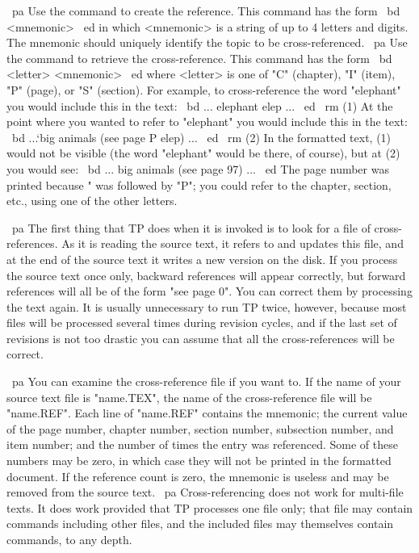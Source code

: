 ~pa Use the command \MR to create the reference.
This command has the form
~bd \MR <mnemonic> ~ed
in which <mnemonic> is a string of up to 4 letters and digits.
The mnemonic should uniquely identify the topic to be cross-referenced.
~pa Use the command \RR to retrieve the cross-reference.
This command has the form
~bd \RR <letter> <mnemonic> ~ed
where <letter> is one of "C" (chapter), "I" (item), "P" (page), 
or "S" (section).
For example, to cross-reference the word "elephant" you would include this
in the text:
~bd ... elephant \MR elep ... ~ed ~rm (1)
At the point where you wanted to refer to "elephant" you would include
this in the text:
~bd ...`big animals (see page \RR P elep) ... ~ed ~rm (2)
In the formatted text, (1) would not be visible (the word "elephant" would
be there, of course), but at (2) you would see:
~bd ... big animals (see page 97) ... ~ed
The page number was printed because \RR" was followed by "P"; you could
refer to the chapter, section, etc., using one of the other letters.

~pa The first thing that TP does when it is invoked is to look for a file
of cross-references.
As it is reading the source text, it refers to and updates this file, and
at the end of the source text it writes a new version on the disk.
If you process the source text once only, backward references will appear
correctly, but forward references will all be of the form "see page 0".
You can correct them by processing the text again.
It is usually unnecessary to run TP twice, however, because most files
will be processed several times during revision cycles, and if the last
set of revisions is not too drastic you can assume that all the
cross-references will be correct.

~pa You can examine the cross-reference file if you want to.
If the name of your source text file is "name.TEX", the name of the
cross-reference file will be "name.REF".
Each line of "name.REF" contains the mnemonic; the current value of the page 
number, chapter number, section number, subsection number, and item number;
and the number of times the entry was referenced.
Some of these numbers may be zero, in which case they will not be printed
in the formatted document.
If the reference count is zero, the mnemonic is useless and may be removed
from the source text.
~pa Cross-referencing does not work for multi-file texts.
It does work provided that TP processes one file only; that file may
contain \IC commands including other files, and the included files
may themselves contain \IC commands, to any depth.

